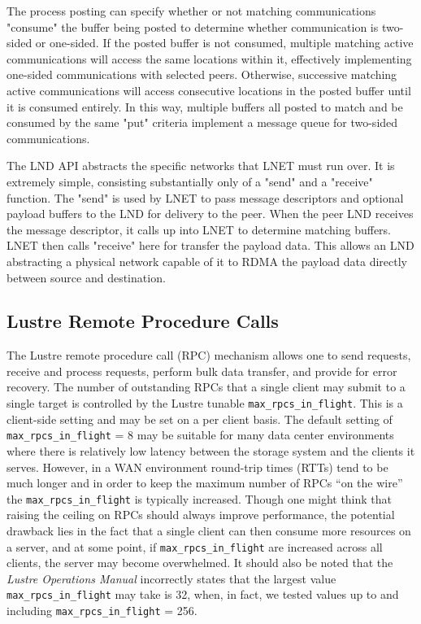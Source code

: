 \documentclass[]{sigplan-proc}
\begin{document}
The process posting can specify whether or not matching communications "consume" the buffer being posted to
determine whether communication is two-sided or one-sided.  If the posted buffer is not consumed, multiple
matching active communications will access the same locations within it, effectively implementing one-sided
communications with selected peers.  Otherwise, successive matching active communications will access
consecutive locations in the posted buffer until it is consumed entirely.  In this way, multiple buffers all
posted to match and be consumed by the same "put" criteria implement a message queue for two-sided
communications.

The LND API abstracts the specific networks that LNET must run over.  It is extremely simple, consisting
substantially only of a "send" and a "receive" function.  The "send" is used by LNET to pass message
descriptors and optional payload buffers to the LND for delivery to the peer.  When the peer LND receives the
message descriptor, it calls up into LNET to determine matching buffers.  LNET then calls "receive" here for
transfer the payload data.  This allows an LND abstracting a physical network capable of it to RDMA the
payload data directly between source and destination.

\subsection{Lustre Remote Procedure Calls}

The Lustre remote procedure call (RPC) mechanism allows one to send requests, receive and process requests,
perform bulk data transfer, and provide for error recovery. The number of outstanding RPCs that a single
client may submit to a single target is controlled by the Lustre tunable {\tt max\_rpcs\_in\_flight}. This is
a client-side setting and may be set on a per client basis. The default setting of {\tt max\_rpcs\_in\_flight}
= 8 may be suitable for many data center environments where there is relatively low latency between the
storage system and the clients it serves. However, in a WAN environment round-trip times (RTTs) tend to be
much longer and in order to keep the maximum number of RPCs ``on the wire'' the {\tt max\_rpcs\_in\_flight} is
typically increased. Though one might think that raising the ceiling on RPCs should always improve
performance, the potential drawback lies in the fact that a single client can then consume more resources on a
server, and at some point, if {\tt max\_rpcs\_in\_flight} are increased across all clients, the server may
become overwhelmed. It should also be noted that the {\it Lustre Operations Manual} \cite{LustreManual2012}
incorrectly states that the largest value {\tt max\_rpcs\_in\_flight} may take is 32, when, in fact, we tested
values up to and including {\tt max\_rpcs\_in\_flight} = 256.
\end{document}
